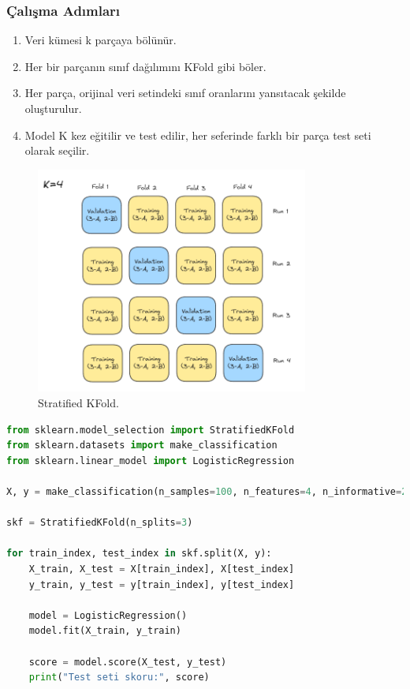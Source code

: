 \subsubsection{Çalışma Adımları}
\begin{enumerate}
    \item Veri kümesi k parçaya bölünür.
    \item Her bir parçanın sınıf dağılımını KFold gibi böler.
    \item Her parça, orijinal veri setindeki sınıf oranlarını yansıtacak şekilde oluşturulur.
    \item Model K kez eğitilir ve test edilir, her seferinde farklı bir parça test seti olarak seçilir.
\end{enumerate}

\begin{figure}[h]
    \centering
    \includegraphics[width=0.8\textwidth]{images/stratified_kfold_structure.png}
    \caption{Stratified KFold.}
    \label{fig:enter-label}
\end{figure}

\begin{lstlisting}[language=Python, caption=Scikit-learn'de Stratified KFold örneği.]
from sklearn.model_selection import StratifiedKFold
from sklearn.datasets import make_classification
from sklearn.linear_model import LogisticRegression

X, y = make_classification(n_samples=100, n_features=4, n_informative=2, n_redundant=0, random_state=42, n_classes=2)

skf = StratifiedKFold(n_splits=3)

for train_index, test_index in skf.split(X, y):
    X_train, X_test = X[train_index], X[test_index]
    y_train, y_test = y[train_index], y[test_index]
    
    model = LogisticRegression()
    model.fit(X_train, y_train)
    
    score = model.score(X_test, y_test)
    print("Test seti skoru:", score)
\end{lstlisting}

